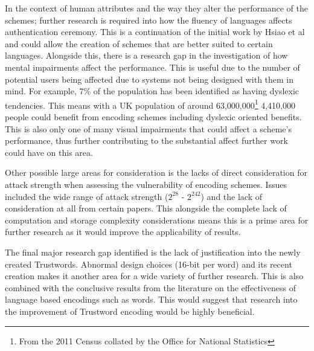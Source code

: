 In the context of human attributes and the way they alter the performance of the schemes; further research is required into how the fluency of languages affects authentication ceremony. This is a continuation of the initial work by Hsiao et al and could allow the creation of schemes that are better suited to certain languages.
Alongside this, there is a research gap in the investigation of how mental impairments affect the performance. This is useful due to the number of potential users being affected due to systems not being designed with them in mind. For example, 7\% of the population has been identified as having dyslexic tendencies\cite{peterson2012developmental}. This means with a UK population of around 63,000,000\footnote{From the 2011 Census collated by the Office for National Statistics}  4,410,000 people could benefit from encoding schemes including dyslexic oriented benefits. This is also only one of many visual impairments that could affect a scheme's performance, thus further contributing to the substantial affect further work could have on this area.

Other possible large areas for consideration is the lacks of direct consideration for attack strength when assessing the vulnerability of encoding schemes. Issues included the wide range of attack strength ($2^{28}$ - $2^{242}$) and the lack of consideration at all from certain papers. This alongside the complete lack of computation and storage complexity considerations means this is a prime area for further research as it would improve the applicability of results.

The final major research gap identified is the lack of justification into the newly created \pep Trustwords. Abnormal design choices (16-bit per word) and its recent creation makes it another area for a wide variety of further research. This is also combined with the conclusive results from the literature on the effectiveness of language based encodings such as words. This would suggest that research into the improvement of Trustword encoding would be highly beneficial.